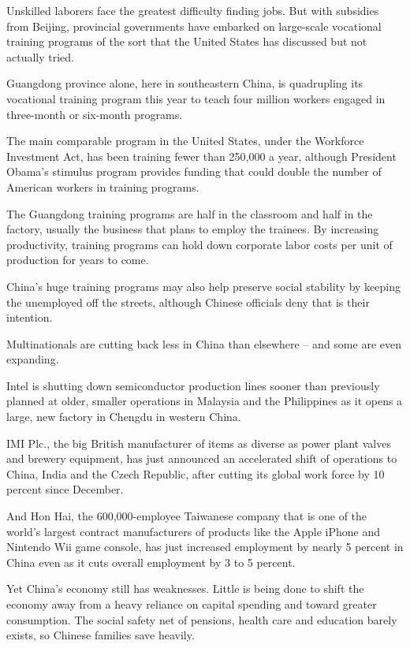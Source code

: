 \documentclass[12pt,a4paper,onecolumn]{article}
\begin{document}
\begin{CJK*}{GBK}{song}
Unskilled laborers face the greatest difficulty finding jobs. But with subsidies from Beijing,
provincial governments have embarked on large-scale vocational training programs of the sort that
the United States has discussed but not actually tried.

Guangdong province alone, here in southeastern China, is quadrupling its vocational training program
this year to teach four million workers engaged in three-month or six-month programs.

The main comparable program in the United States, under the Workforce Investment Act, has been
training fewer than 250,000 a year, although President Obama's stimulus program provides funding
that could double the number of American workers in training programs.

The Guangdong training programs are half in the classroom and half in the factory, usually the
business that plans to employ the trainees. By increasing productivity, training programs can hold
down corporate labor costs per unit of production for years to come.

China's huge training programs may also help preserve social stability by keeping the unemployed off
the streets, although Chinese officials deny that is their intention.

Multinationals are cutting back less in China than elsewhere -- and some are even expanding.

Intel is shutting down semiconductor production lines sooner than previously planned at older,
smaller operations in Malaysia and the Philippines as it opens a large, new factory in Chengdu in
western China.

IMI Plc., the big British manufacturer of items as diverse as power plant valves and brewery
equipment, has just announced an accelerated shift of operations to China, India and the Czech
Republic, after cutting its global work force by 10 percent since December.

And Hon Hai, the 600,000-employee Taiwanese company that is one of the world's largest contract
manufacturers of products like the Apple iPhone and Nintendo Wii game console, has just increased
employment by nearly 5 percent in China even as it cuts overall employment by 3 to 5 percent.

Yet China's economy still has weaknesses. Little is being done to shift the economy away from a
heavy reliance on capital spending and toward greater consumption. The social safety net of
pensions, health care and education barely exists, so Chinese families save heavily.


\end{CJK*}
\end{document}
